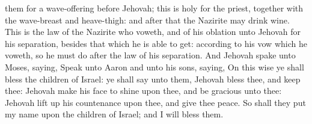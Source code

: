 them for a wave-offering before Jehovah; this is holy for the priest, together with the wave-breast and heave-thigh: and after that the Nazirite may drink wine.  This is the law of the Nazirite who voweth, and of his oblation unto Jehovah for his separation, besides that which he is able to get: according to his vow which he voweth, so he must do after the law of his separation.  And Jehovah spake unto Moses, saying, Speak unto Aaron and unto his sons, saying, On this wise ye shall bless the children of Israel: ye shall say unto them,  Jehovah bless thee, and keep thee:  Jehovah make his face to shine upon thee, and be gracious unto thee:  Jehovah lift up his countenance upon thee, and give thee peace.  So shall they put my name upon the children of Israel; and I will bless them. 

